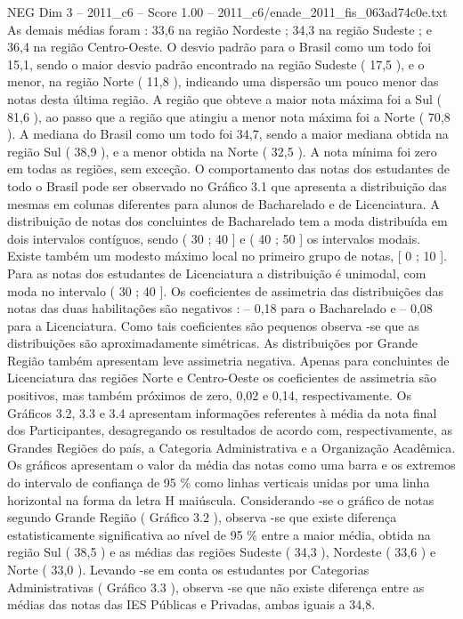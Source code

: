 \begin{textsample}{NEG Dim 3 – 2011\_c6 – Score 1.00 – 2011\_c6/enade\_2011\_fis\_063ad74c0e.txt}
As demais médias foram : 33,6 na região Nordeste ; 34,3 na região Sudeste ; e 36,4 na região Centro-Oeste.
O desvio padrão para o Brasil como um todo foi 15,1, sendo o maior desvio padrão encontrado na região Sudeste ( 17,5 ), e o menor, na região Norte ( 11,8 ), indicando uma dispersão um pouco menor das notas desta última região.
A região que obteve a maior nota máxima foi a Sul ( 81,6 ), ao passo que a região que atingiu a menor nota máxima foi a Norte ( 70,8 ).
A mediana do Brasil como um todo foi 34,7, sendo a maior mediana obtida na região Sul ( 38,9 ), e a menor obtida na Norte ( 32,5 ).
A nota mínima foi zero em todas as regiões, sem exceção.
O comportamento das notas dos estudantes de todo o Brasil pode ser observado no Gráfico 3.1 que apresenta a distribuição das mesmas em colunas diferentes para alunos de Bacharelado e de Licenciatura.
A distribuição de notas dos concluintes de Bacharelado tem a moda distribuída em dois intervalos contíguos, sendo ( 30 ; 40 ] e ( 40 ; 50 ] os intervalos modais.
Existe também um modesto máximo local no primeiro grupo de notas, [ 0 ; 10 ].
Para as notas dos estudantes de Licenciatura a distribuição é unimodal, com moda no intervalo ( 30 ; 40 ].
Os coeficientes de assimetria das distribuições das notas das duas habilitações são negativos : – 0,18 para o Bacharelado e – 0,08 para a Licenciatura.
Como tais coeficientes são pequenos observa -se que as distribuições são aproximadamente simétricas.
As distribuições por Grande Região também apresentam leve assimetria negativa.
Apenas para concluintes de Licenciatura das regiões Norte e Centro-Oeste os coeficientes de assimetria são positivos, mas também próximos de zero, 0,02 e 0,14, respectivamente.
Os Gráficos 3.2, 3.3 e 3.4 apresentam informações referentes à média da nota final dos Participantes, desagregando os resultados de acordo com, respectivamente, as Grandes Regiões do país, a Categoria Administrativa e a Organização Acadêmica.
Os gráficos apresentam o valor da média das notas como uma barra e os extremos do intervalo de confiança de 95 \% como linhas verticais unidas por uma linha horizontal na forma da letra H maiúscula.
Considerando -se o gráfico de notas segundo Grande Região ( Gráfico 3.2 ), observa -se que existe diferença estatisticamente significativa ao nível de 95 \% entre a maior média, obtida na região Sul ( 38,5 ) e as médias das regiões Sudeste ( 34,3 ), Nordeste ( 33,6 ) e Norte ( 33,0 ).
Levando -se em conta os estudantes por Categorias Administrativas ( Gráfico 3.3 ), observa -se que não existe diferença entre as médias das notas das IES Públicas e Privadas, ambas iguais a 34,8.

\end{textsample}
